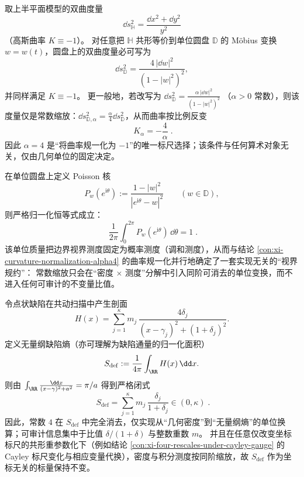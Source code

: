 \begin{proposition}\label{con:xi-curvature-normalization-alpha4}
取上半平面模型的双曲度量
\[
\dd s_{\mathbb{H}}^{2}=\frac{\dd x^{2}+\dd y^{2}}{y^{2}}
\]
（高斯曲率 \(K\equiv -1\)）。
对任意把 \(\mathbb{H}\) 共形等价到单位圆盘 \(\mathbb{D}\) 的 Möbius 变换 \(w=w(t)\)，圆盘上的双曲度量必可写为
\[
\dd s_{\mathbb{D}}^{2}=\frac{4\,|\dd w|^{2}}{(1-|w|^{2})^{2}},
\]
并同样满足 \(K\equiv -1\)。
更一般地，若改写为
\(
\dd s_{\mathbb{D}}^{2}=\frac{\alpha\,|\dd w|^{2}}{(1-|w|^{2})^{2}}
\)
（\(\alpha>0\) 常数），则该度量仅是常数缩放：\(\dd s_{\mathbb{D},\alpha}^{2}=\frac{\alpha}{4}\dd s_{\mathbb{D}}^{2}\)，从而曲率按比例反变
\[
\boxed{\;K_{\alpha}=-\frac{4}{\alpha}\; }.
\]
因此 \(\alpha=4\) 是“将曲率规一化为 \(-1\)”的唯一标尺选择；该条件与任何算术对象无关，仅由几何单位的固定决定。
\end{proposition}

\begin{proposition}\label{con:xi-poisson-kernel-unit-mass-normalization}
在单位圆盘上定义 Poisson 核
\[
P_{w}(e^{\mathrm{i}\theta})
:=\frac{1-|w|^{2}}{|e^{\mathrm{i}\theta}-w|^{2}}
\qquad(w\in\mathbb{D}),
\]
则严格归一化恒等式成立：
\[
\boxed{\;
\frac{1}{2\pi}\int_{0}^{2\pi}P_{w}(e^{\mathrm{i}\theta})\,\dd\theta=1\; }.
\]
该单位质量把边界视界测度固定为概率测度（调和测度），从而与结论 \ref{con:xi-curvature-normalization-alpha4} 的曲率规一化并行地确定了一套实现无关的“视界规约”：
常数缩放只会在“密度 \(\times\) 测度”分解中引入同阶可消去的单位变换，而不进入任何可审计的不变量比值。
\end{proposition}



\begin{proposition}\label{con:xi-defect-entropy-coordinate_invariant}
令点状缺陷在共动扫描中产生剖面
\[
H(x)=\sum_{j=1}^{\kappa} m_j\,\frac{4\delta_j}{(x-\gamma_j)^2+(1+\delta_j)^2}.
\]
定义无量纲缺陷熵（亦可理解为缺陷通量的归一化面积）
\[
S_{\mathrm{def}}
:=\frac{1}{4\pi}\int_{\RR}H(x)\,\dd x.
\]
则由 \(\int_{\RR}\frac{\dd x}{(x-\gamma)^2+a^2}=\pi/a\) 得到严格闭式
\[
\boxed{\;
S_{\mathrm{def}}
=\sum_{j=1}^{\kappa}m_j\,\frac{\delta_j}{1+\delta_j}\in(0,\kappa)\; }.
\]
因此，常数 \(4\) 在 \(S_{\mathrm{def}}\) 中完全消去，仅实现从“几何密度”到“无量纲熵”的单位换算；可审计信息集中于比值 \(\delta/(1+\delta)\) 与整数重数 \(m\)。
并且在任意仅改变坐标标尺的共形重参数化下（例如结论 \ref{con:xi-four-rescales-under-cayley-gauge} 的 Cayley 标尺变化与相应变量代换），密度与积分测度按同阶缩放，故 \(S_{\mathrm{def}}\) 作为坐标无关的标量保持不变。
\end{proposition}

